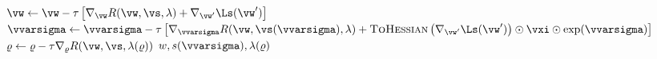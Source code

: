 \begin{algorithm}[ht]
\begin{algorithmic}[1]
        \State $\vw \gets \vw- \tau\left[\nabla_\vw R(\vw, \vs, \lambda)+\nabla_{\vw'}\Ls(\vw')\right]$
        \State $\vvarsigma \gets \vvarsigma - \tau\left[\nabla_\vvarsigma R(\vw, \vs(\vvarsigma), \lambda)+\textsc{ToHessian}\left(\nabla_{\vw'}\Ls(\vw')\right)\odot \vxi \odot \exp(\vvarsigma)\right]$
        \State $\varrho \gets \varrho - \tau\nabla_{\varrho}R(\vw,\vs,\lambda(\varrho))$ 
    \EndFor
    \State \Return $w, s(\vvarsigma), \lambda(\varrho)$
\EndProcedure
\end{algorithmic}
\label{alg:pac}
\end{algorithm}


